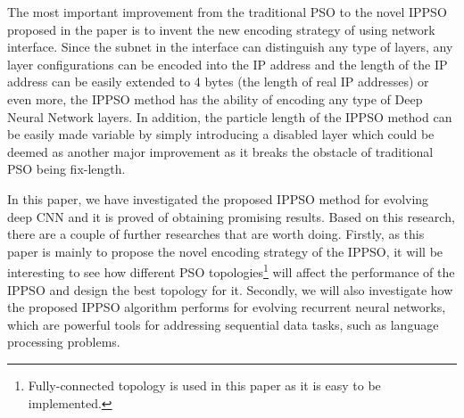 \documentclass[conference]{IEEEtran}
\begin{document}
The most important improvement from the traditional PSO to the novel IPPSO proposed in the paper is to invent the new encoding strategy of using network interface. Since the subnet in the interface can distinguish any type of layers, any layer configurations can be encoded into the IP address and the length of the IP address can be easily extended to 4 bytes (the length of real IP addresses) or even more, the IPPSO method has the ability of encoding any type of Deep Neural Network layers. In addition, the particle length of the IPPSO method can be easily made variable by simply introducing a disabled layer which could be deemed as another major improvement as it breaks the obstacle of traditional PSO being fix-length.


In this paper, we have investigated the proposed IPPSO method for evolving deep CNN and it is proved of obtaining promising results. Based on this research, there are a couple of further researches that are worth doing. Firstly, as this paper is mainly to propose the novel encoding strategy of the IPPSO, it will be interesting to see how different PSO topologies\footnote{Fully-connected topology is used in this paper as it is easy to be implemented.} will affect the performance of the IPPSO and design the best topology for it. Secondly, we will also investigate how the proposed IPPSO algorithm performs for evolving recurrent neural networks, which are powerful tools for addressing sequential data tasks, such as language processing problems.











\end{document}
